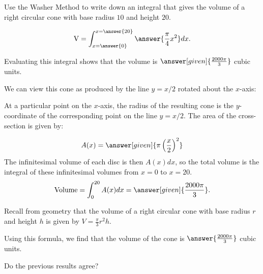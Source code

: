 \documentclass{ximera}
\author{Bart Snapp}
\begin{document}
\begin{exercise} 
Use the Washer Method to write down an integral that gives the volume of a right circular cone with base radius $10$ and height $20$.

\[
\text{V} = 
  \int_{x=\answer{0}}^{x=\answer{20}} \answer{\frac{\pi}{4} x^2} dx.
\]

Evaluating this integral shows that the volume is $\answer[given]{\frac{2000\pi}{3}}$ cubic units.


\begin{hint}
We can view this cone as produced by the line $y=x/2$ rotated about
the $x$-axis:
\begin{image}
\end{image}

At a particular point on the $x$-axis, the radius of the resulting cone is the $y$-coordinate of the corresponding point on the line
$y=x/2$. The area of the cross-section is given by: 

\[
A(x) = \answer[given]{\pi \left(\frac{x}{2}\right)^2}
\]
The infinitesimal volume of each disc is then $A(x) dx$, so the
total volume is the integral of these infinitesimal volumes from $x =
0$ to $x = 20$.
\[
\text{Volume} = 
  \int_0^{20} A(x) dx=\answer[given]{\frac{2000\pi}{3}}.
\]
\end{hint}

\begin{exercise}
Recall from geometry that the volume of a right circular cone with base radius $r$ and height $h$ is given by $V =\frac{\pi}{3}r^2h$.  

Using this formula, we find that the volume of the cone is $\answer{\frac{2000 \pi}{3}}$ cubic units.

Do the previous results agree?

\begin{multipleChoice}
\end{multipleChoice}
\end{exercise}
\end{exercise}
\end{document}
